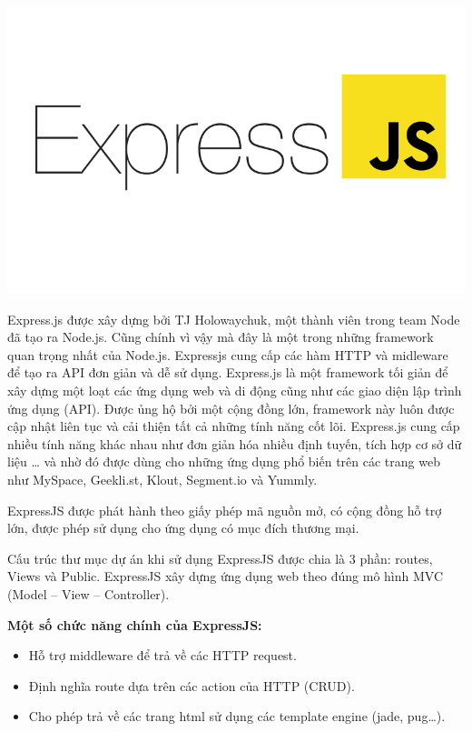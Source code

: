 \begin{center}
  \captionsetup{type=figure}
  \includegraphics[width=15cm]{img/expressjs.png}
\end{center}

Express.js được xây dựng bởi TJ Holowaychuk, một thành viên trong team Node đã tạo ra Node.js. Cũng chính vì vậy mà đây là một trong những framework quan trọng nhất của Node.js. Expressjs cung cấp các hàm HTTP và midleware để tạo ra API đơn giản và dễ sử dụng. Express.js là một framework tối giản để xây dựng một loạt các ứng dụng web và di động cũng như các giao diện lập trình ứng dụng (API). Được ủng hộ bởi một cộng đồng lớn, framework này luôn được cập nhật liên tục và cải thiện tất cả những tính năng cốt lõi. Express.js cung cấp nhiều tính năng khác nhau như đơn giản hóa nhiều định tuyến, tích hợp cơ sở dữ liệu … và nhờ đó được dùng cho những ứng dụng phổ biến trên các trang web như MySpace, Geekli.st, Klout, Segment.io và Yummly.

ExpressJS được phát hành theo giấy phép mã nguồn mở, có cộng đồng hỗ trợ lớn, được phép sử dụng cho ứng dụng có mục đích thương mại.

Cấu trúc thư mục dự án khi sử dụng ExpressJS được chia là 3 phần: routes, Views và Public. ExpressJS xây dựng ứng dụng web theo đúng mô hình MVC (Model – View – Controller).

\textbf{Một số chức năng chính của ExpressJS:}
\begin{itemize}
  \item Hỗ trợ middleware để trả về các HTTP request.
  \item Định nghĩa route dựa trên các action của HTTP (CRUD).
  \item Cho phép trả về các trang html sử dụng các template engine (jade, pug…).
\end{itemize}

